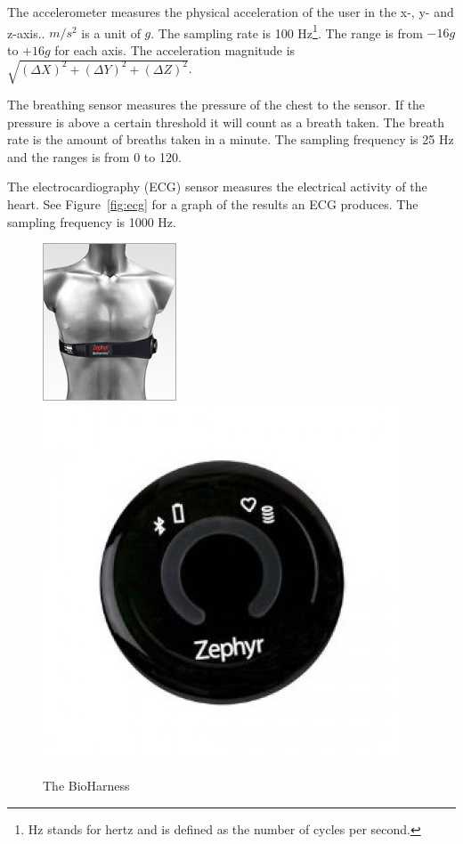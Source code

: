 			The accelerometer measures the physical acceleration of the user in the x-, y- and z-axis.. $m/s^2$ is a unit of $g$. The sampling rate is 100 Hz\footnote{Hz stands for hertz and is defined as the number of cycles per second.}. The range is from $-16g$ to $+16g$ for each axis. The acceleration magnitude is $\sqrt{(\Delta X)^2+(\Delta Y)^2+(\Delta Z)^2}$.

			The breathing sensor measures the pressure of the chest to the sensor. If the pressure is above a certain threshold it will count as a breath taken. The breath rate is the amount of breaths taken in a minute. The sampling frequency is 25 Hz and the ranges is from 0 to 120.

			The electrocardiography\cite{ECG} (ECG) sensor measures the electrical activity of the heart. See Figure~\ref{fig:ecg} for a graph of the results an ECG produces. The sampling frequency is 1000 Hz.

			\begin{figure}[h]
				\centering
					\includegraphics[scale=2.0]{bh.jpg}
					\includegraphics[scale=0.25]{bhclose.jpg}
					
					\caption{The BioHarness}

			\end{figure}

